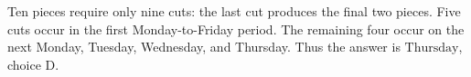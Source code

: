 Ten pieces require only nine cuts: the last cut produces the final two pieces. Five cuts occur in the first Monday-to-Friday period. The remaining four occur on the next Monday, Tuesday, Wednesday, and Thursday. Thus the answer is $\boxed{\text{Thursday}}$, choice $\boxed{\text{D}}$.
